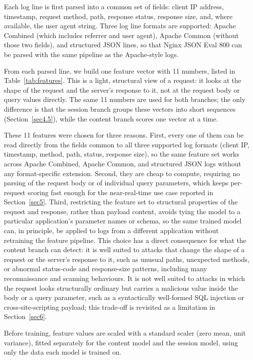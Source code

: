 \documentclass[futureinternet,article,submit,moreauthors]{Definitions/mdpi}
\begin{document}
Each log line is first parsed into a common set of fields: client IP address, timestamp, request method, path, response status, response size, and, where available, the user agent string. Three log line formats are supported: Apache Combined (which includes referrer and user agent), Apache Common (without those two fields), and structured JSON lines, so that Nginx JSON Eval 800 can be parsed with the same pipeline as the Apache-style logs.

From each parsed line, we build one feature vector with 11 numbers, listed in Table~\ref{tab:features}. This is a light, structural view of a request: it looks at the shape of the request and the server's response to it, not at the request body or query values directly. The same 11 numbers are used for both branches; the only difference is that the session branch groups these vectors into short sequences (Section~\ref{sec4.5}), while the content branch scores one vector at a time.

These 11 features were chosen for three reasons. First, every one of them can be read directly from the fields common to all three supported log formats (client IP, timestamp, method, path, status, response size), so the same feature set works across Apache Combined, Apache Common, and structured JSON logs without any format-specific extension. Second, they are cheap to compute, requiring no parsing of the request body or of individual query parameters, which keeps per-request scoring fast enough for the near-real-time use case reported in Section~\ref{sec5}. Third, restricting the feature set to structural properties of the request and response, rather than payload content, avoids tying the model to a particular application's parameter names or schema, so the same trained model can, in principle, be applied to logs from a different application without retraining the feature pipeline. This choice has a direct consequence for what the content branch can detect: it is well suited to attacks that change the shape of a request or the server's response to it, such as unusual paths, unexpected methods, or abnormal status-code and response-size patterns, including many reconnaissance and scanning behaviours. It is not well suited to attacks in which the request looks structurally ordinary but carries a malicious value inside the body or a query parameter, such as a syntactically well-formed SQL injection or cross-site-scripting payload; this trade-off is revisited as a limitation in Section~\ref{sec6}.

Before training, feature values are scaled with a standard scaler (zero mean, unit variance), fitted separately for the content model and the session model, using only the data each model is trained on.
\end{document}
